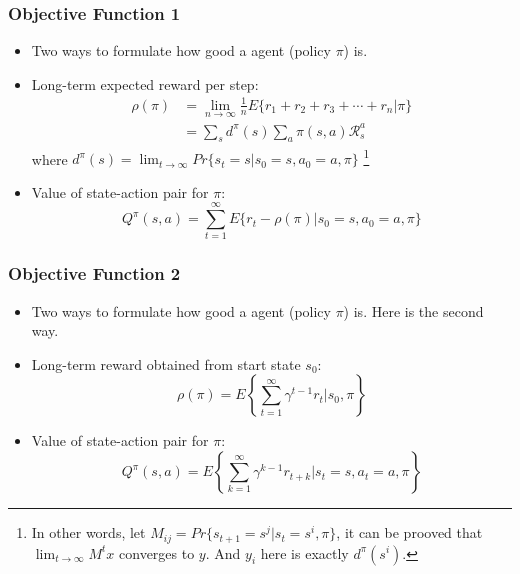 \begin{frame}
  \frametitle{Objective Function 1}
  \begin{itemize}
  \item Two ways to formulate how good a agent (policy $\pi$) is.
  \item Long-term expected reward per step:
    \begin{align*}
         \rho(\pi)
      &= \lim_{n \to \infty} \frac{1}{n} E\{r_1 + r_2 + r_3 + \cdots + r_n | \pi\} \\
      &= \sum_s d^{\pi} (s) \sum_a \pi(s, a) \mathcal{R}_s^a
    \end{align*}
    where $d^\pi(s) = \lim_{t \to \infty} Pr\{s_t = s | s_0 = s, a_0 = a, \pi\}$
    \footnote{In other words, let $M_{ij} = Pr\{s_{t+1} = s^j | s_t = s^i, \pi\}$, it can be prooved that $\lim_{t \to \infty} M^t x$ converges to $y$. And $y_i$ here is exactly $d^{\pi}(s^i)$.}
  \item Value of state-action pair for $\pi$:
    \begin{equation*}
      Q^\pi(s, a) = \sum_{t=1}^{\infty} E\{r_t - \rho(\pi) | s_0 = s, a_0 = a, \pi \}
    \end{equation*}
  \end{itemize}
\end{frame}


\begin{frame}
  \frametitle{Objective Function 2}
  \begin{itemize}
  \item Two ways to formulate how good a agent (policy $\pi$) is. Here is the second way.
  \item Long-term reward obtained from start state $s_0$:
    \begin{equation*}
      \rho(\pi) = E \left\{\sum_{t=1}^{\infty} \gamma^{t-1}r_t | s_0, \pi \right\}
    \end{equation*}
  \item Value of state-action pair for $\pi$:
    \begin{equation*}
      Q^\pi(s, a) = E \left\{\sum_{k=1}^\infty \gamma^{k-1} r_{t+k} | s_t = s, a_t = a, \pi \right\}
    \end{equation*}
  \end{itemize}
\end{frame}